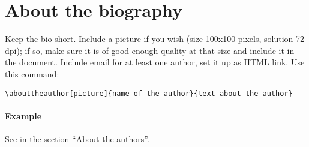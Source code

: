 \documentclass{jotarticle}
\begin{document}
\section{About the biography}


Keep the bio short. Include a picture if you wish (size 100x100 pixels,
solution 72 dpi); if so, make sure it is of good enough quality at 
that size and include it in the document. Include email for at 
least one author, set it up as HTML link. Use this command: 

\begin{verbatim}
\abouttheauthor[picture]{name of the author}{text about the author}
\end{verbatim}

\paragraph{Example} See in the section ``About the authors''.


\begin{thebibliography}{XXXXX}

\bibitem[]{}

\end{thebibliography}



\abouttheauthors




\end{document}
